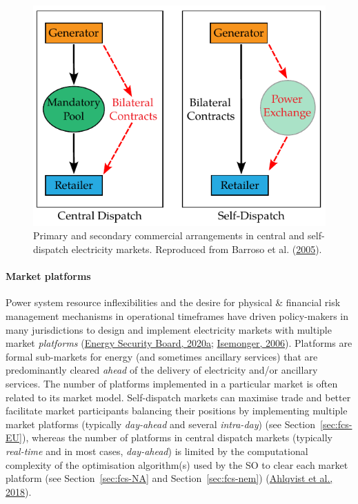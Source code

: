 \documentclass[12pt,a4paper,]{report}
\begin{document}
\begin{figure}
\hypertarget{fig:market_models}{%
\centering
\includegraphics{source/figures/market_models.pdf}
\caption[Primary and secondary commercial arrangements in central and
self-dispatch electricity markets]{Primary and secondary commercial
arrangements in central and self-dispatch electricity markets.
Reproduced from Barroso et al.
(\protect\hyperlink{ref-barrosoClassificationElectricityMarket2005}{2005}).}\label{fig:market_models}
}
\end{figure}

\hypertarget{sec:lit_review-operational_paradigms-markets-platforms}{%
\paragraph{Market
platforms}\label{sec:lit_review-operational_paradigms-markets-platforms}}

Power system resource inflexibilities and the desire for physical \&
financial risk management mechanisms in operational timeframes have
driven policy-makers in many jurisdictions to design and implement
electricity markets with multiple market \emph{platforms}
(\protect\hyperlink{ref-energysecurityboardSystemServicesAhead2020}{Energy
Security Board, 2020a};
\protect\hyperlink{ref-isemongerBenefitsRisksVirtual2006}{Isemonger,
2006}). Platforms are formal sub-markets for energy (and sometimes
ancillary services) that are predominantly cleared \emph{ahead} of the
delivery of electricity and/or ancillary services. The number of
platforms implemented in a particular market is often related to its
market model. Self-dispatch markets can maximise trade and better
facilitate market participants balancing their positions by implementing
multiple market platforms (typically \emph{day-ahead} and several
\emph{intra-day}) (see Section~\ref{sec:fcs-EU}), whereas the number of
platforms in central dispatch markets (typically \emph{real-time} and in
most cases, \emph{day-ahead}) is limited by the computational complexity
of the optimisation algorithm(s) used by the SO to clear each market
platform (see Section~\ref{sec:fcs-NA} and Section~\ref{sec:fcs-nem})
(\protect\hyperlink{ref-ahlqvistCentralSelfDispatchElectricity2018}{Ahlqvist
et al., 2018}).
\end{document}
